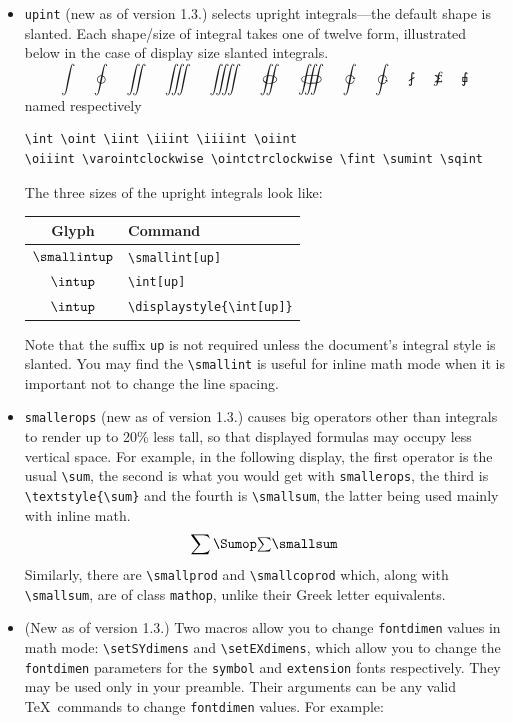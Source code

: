 \documentclass[11pt]{article}
\theoremstyle{oldplain}
\theoremstyle{plain}
\begin{document}
\begin{itemize}
\item {\tt upint} (new as of version 1.3.) selects upright integrals---the default shape is slanted. Each shape/size of integral takes one of twelve form, illustrated below in the case of display size slanted integrals.
\[\int\quad\oint\quad\iint\quad\iiint\quad\iiiint\quad\oiint\quad\oiiint\quad\varointclockwise\quad\ointctrclockwise\quad\fint\quad\sumint\quad\sqint\]
named respectively
\begin{verbatim}
\int \oint \iint \iiint \iiiint \oiint 
\oiiint \varointclockwise \ointctrclockwise \fint \sumint \sqint
\end{verbatim}
The three sizes of the upright integrals look like:
\begin{center}
  \begin{tabular}{@{} cl @{}}
    \hline
    Glyph & Command\\ 
    \hline
    $\smallintup$ & \verb|\smallint[up]|\\ 
    $\intup$ & \verb|\int[up]|  \\ 
    $\displaystyle{\intup}$ & \verb|\displaystyle{\int[up]}|\\ 
    \hline
  \end{tabular}
\end{center}
Note that the suffix {\tt up} is not required unless the document's integral style is slanted. You may find the \verb|\smallint| is useful for inline math mode when it is important not to change the line spacing.
\item {\tt smallerops} (new as of version 1.3.) causes big operators other than integrals to render up to 20\% less tall, so that displayed formulas may occupy less vertical space. For example, in the following display, the first operator is the usual \verb|\sum|, the second is what you would get with {\tt smallerops}, the third is \verb|\textstyle{\sum}| and the fourth is \verb|\smallsum|, the latter being used mainly with inline math. 
\[\sum \Sumop \textstyle{\sum} \smallsum\]
Similarly, there are \verb|\smallprod| and \verb|\smallcoprod| which, along with \verb|\smallsum|, are of class {\tt mathop}, unlike their Greek letter equivalents.
\item (New as of version 1.3.) Two macros allow you to change {\tt fontdimen} values in math mode: \verb|\setSYdimens| and \verb|\setEXdimens|, which allow you to change the {\tt fontdimen} parameters for the {\tt symbol} and {\tt extension} fonts respectively. They may be used only in your preamble. Their arguments can be any valid \TeX\ commands to change {\tt fontdimen} values. For example:

\end{itemize}
\end{document}
